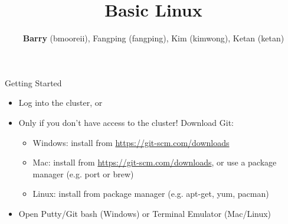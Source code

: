 \documentclass[hyperref={pdfpagelabels=false},12pt]{beamer}
\title[Basic Unix/Linux]{{Basic Linux}}
\author[Basic Unix/Linux]{{\textbf{Barry} (bmooreii), Fangping (fangping), Kim (kimwong), Ketan (ketan)}}
\institute[CRC]{Center for Research Computing}
\date{}
\begin{document}
\begin{frame}[label=started]{Getting Started}
    \begin{itemize}
        \item Log into the cluster, or
        \item Only if you don't have access to the cluster! Download Git:
        \begin{itemize}
            \item Windows: install from \url{https://git-scm.com/downloads}
            \item Mac: install from \url{https://git-scm.com/downloads}, or use a package manager (e.g. port or brew)
            \item Linux: install from package manager (e.g. apt-get, yum, pacman)
        \end{itemize}
        \item Open Putty/Git bash (Windows) or Terminal Emulator (Mac/Linux)
    \end{itemize}
\inputminted[bgcolor=lightgray,linenos,fontsize=\scriptsize]{bash}{../code/getting-started.txt}
\end{frame}
\end{document}
